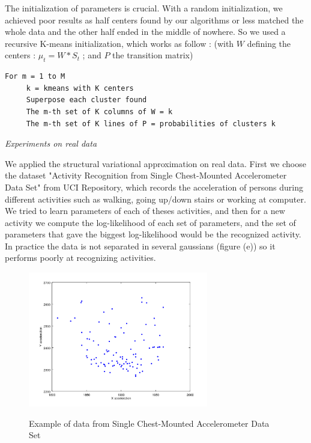 \documentclass[10pt,a4paper]{report}
\begin{document}
\vspace{5pt}

The initialization of parameters is crucial. With a random initialization, we achieved poor results as half centers found by our algorithms or less matched the whole data and the other half ended in the middle of nowhere. So we used a recursive K-means initialization, which works as follow : (with $W$ defining the centers : $\mu_t = W*S_t$ ; and $P$ the transition matrix)

\large{
\begin{verbatim}
For m = 1 to M
     k = kmeans with K centers
     Superpose each cluster found
     The m-th set of K columns of W = k
     The m-th set of K lines of P = probabilities of clusters k
\end{verbatim}
}





\clearpage
\begin{center}
\end{center}
\vspace{80pt}
\begin{center}
\Huge{\textit{Experiments on real data}}
\end{center}
\vspace{20pt}

\Large{
We applied the structural variational approximation on real data. First we choose the dataset "Activity Recognition from Single Chest-Mounted Accelerometer Data Set" from UCI Repository, which records the acceleration of persons during different activities such as walking, going up/down stairs or working at computer. We tried to learn parameters of each of theses activities, and then for a new activity we compute the log-likelihood of each set of parameters, and the set of parameters that gave the biggest log-likelihood would be the recognized activity. In practice the data is not separated in several gaussians (figure (e)) so it performs poorly at recognizing activities.
}
\begin{figure}[h]
	\centering
	\includegraphics[width=0.7\textwidth]{standing.png}
	\centerline{\Large{Example of data from Single Chest-Mounted Accelerometer Data Set}}
	\label{fig:e}
\end{figure}
\end{document}
